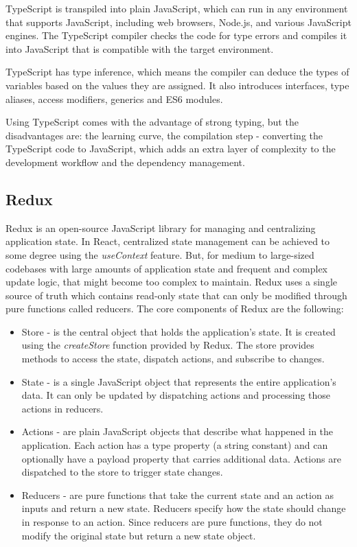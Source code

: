 \par TypeScript is transpiled into plain JavaScript, which can run in any environment that supports JavaScript, including web browsers, Node.js, and various JavaScript engines. The TypeScript compiler checks the code for type errors and compiles it into JavaScript that is compatible with the target environment.

\par TypeScript has type inference, which means the compiler can deduce the types of variables based on the values they are assigned. It also introduces interfaces, type aliases, access modifiers, generics and ES6 modules.

\par Using TypeScript comes with the advantage of strong typing, but the disadvantages are: the learning curve, the compilation step - converting the TypeScript code to JavaScript, which adds an extra layer of complexity to the development workflow and the dependency management.

\subsection{Redux}

\par Redux is an open-source JavaScript library for managing and centralizing application state. In React, centralized state management can be achieved to some degree using the \textit{useContext} feature. But, for medium to large-sized codebases with large amounts of application state and frequent and complex update logic, that might become too complex to maintain. Redux uses a single source of truth which contains read-only state that can only be modified through pure functions called reducers. The core components of Redux are the following:

\begin{itemize}
    \item Store - is the central object that holds the application’s state. It is created using the \textit{createStore} function provided by Redux. The store provides methods to access the state, dispatch actions, and subscribe to changes.
    \item State - is a single JavaScript object that represents the entire application’s data. It can only be updated by dispatching actions and processing those actions in reducers.
    \item Actions - are plain JavaScript objects that describe what happened in the application. Each action has a type property (a string constant) and can optionally have a payload property that carries additional data. Actions are dispatched to the store to trigger state changes.
    \item Reducers - are pure functions that take the current state and an action as inputs and return a new state. Reducers specify how the state should change in response to an action. Since reducers are pure functions, they do not modify the original state but return a new state object.
\end{itemize}

